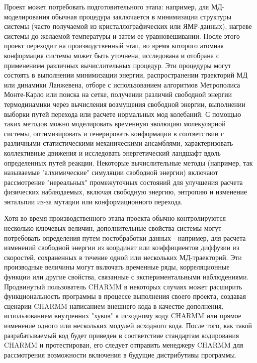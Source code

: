 Проект может потребовать подготовительного этапа: например, для МД-моделирования обычная процедура заключается в минимизации \newline структуры системы (часто получаемой из кристаллографических или ЯМР-данных), нагреве системы до желаемой температуры и затем ее уравновешивании. После этого проект переходит на производственный этап, во время которого атомная конформация системы может быть уточнена, исследована и отобрана с применением различных вычислительных процедур. Эти процедуры могут состоять в выполнении минимизации энергии, распространении траекторий МД или динамики Ланжевена, отборе с использованием алгоритмов Метрополиса Монте-Карло или поиска на сетке, получении различий свободной энергии термодинамики через вычисления возмущения свободной энергии, выполнении выборки путей перехода или расчете нормальных мод колебаний. С помощью таких методов можно моделировать временную эволюцию молекулярной системы, оптимизировать и генерировать конформации в соответствии с различными статистическими механическими ансамблями, характеризовать коллективные движения и исследовать энергетический ландшафт вдоль определенных путей реакции. Некоторые вычислительные методы (например, так называемые "алхимические" симуляции свободной энергии) включают рассмотрение "нереальных" промежуточных состояний для улучшения расчета физических наблюдаемых, включая свободную энергию, энтропию и изменение энтальпии из-за мутации или конформационного перехода.

Хотя во время производственного этапа проекта обычно контролируются несколько ключевых величин, дополнительные свойства системы могут потребовать определения путем постобработки данных - например, для расчета изменений свободной энергии из координат или коэффициентов диффузии из скоростей, сохраненных в течение одной или нескольких МД-траекторий. Эти производные величины могут включать временные ряды, корреляционные функции или другие свойства, связанные с экспериментальными наблюдениями. Продвинутый пользователь CHARMM в некоторых случаях может расширить функциональность программы в процессе выполнения своего проекта, создавая сценарии CHARMM написанием внешнего кода в качестве дополнения, использованием внутренних "хуков" к исходному коду CHARMM или прямое изменение одного или нескольких модулей исходного кода. После того, как такой разрабатываемый код будет приведен в соответствие стандартам кодирования CHARMM и протестирован, его следует отправить менеджеру CHARMM для рассмотрения возможности включения в будущие дистрибутивы программы.

